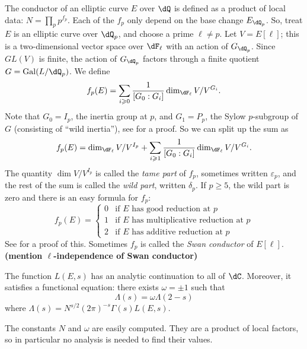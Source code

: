 The conductor of an elliptic curve $E$ over $\dQ$ is defined as a product of 
local data: $N = \prod_p p^{f_p}$. Each of the $f_p$ only depend on the base 
change $E_{\dQ_p}$. So, treat $E$ is an elliptic curve over $\dQ_p$, and 
choose a prime $\ell\ne p$. Let $V=E[\ell]$; this is a two-dimensional vector 
space over $\dF_\ell$ with an action of $G_{\dQ_p}$. Since $GL(V)$ is finite, 
the action of $G_{\dQ_p}$ factors through a finite quotient 
$G=\gal(L/\dQ_p)$. We define 
\[
  f_p(E) = \sum_{i\geqslant 0} \frac{1}{[G_0:G_i]} \dim_{\dF_\ell} V/V^{G_i} \text{.}
\]
Note that $G_0=I_p$, the inertia group at $p$, and $G_1=P_p$, the Sylow 
$p$-subgroup of $G$ (consisting of ``wild inertia''), see \cite[IV]{se79} for a 
proof. So we can split up the sum as 
\[
  f_p(E) = \dim_{\dF_\ell} V/V^{I_p} + \sum_{i\geqslant 1} \frac{1}{[G_0:G_i]} \dim_{\dF_\ell} V/V^{G_i} \text{.}
\]
The quantity $\dim V/V^{I_p}$ is called the \emph{tame part} of $f_p$, 
sometimes written $\varepsilon_p$, and the 
rest of the sum is called the \emph{wild part}, written $\delta_p$. If 
$p\geqslant 5$, the wild part is zero and there is an easy formula for $f_p$: 
\[
  f_p(E) 
    = \begin{cases}
        0 & \text{if $E$ has good reduction at $p$} \\
        1 & \text{if $E$ has multiplicative reduction at $p$} \\
        2 & \text{if $E$ has additive reduction at $p$} 
      \end{cases}
\]
See \cite[IV.10.2]{si94} for a proof of this. Sometimes $f_p$ is called the 
\emph{Swan conductor} of $E[\ell]$. \textbf{(mention $\ell$-independence of 
Swan conductor)}

\begin{theorem}\label{thm:L-cont}
The function $L(E,s)$ has an analytic continuation to all of $\dC$. Moreover, 
it satisfies a functional equation: there exists $\omega =\pm 1$ such that 
\[
  \Lambda(s) = \omega \Lambda(2-s)
\]
where $\Lambda(s) = N^{s/2} (2\pi)^{-s} \Gamma(s) L(E,s)$. 
\end{theorem}

The constants $N$ and $\omega$ are easily computed. They are a product of 
local factors, so in particular no analysis is needed to find their values. 

